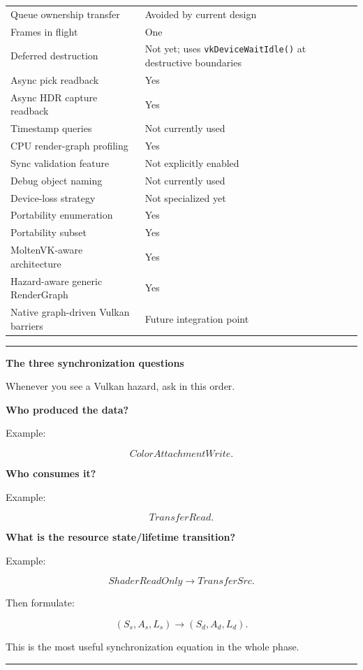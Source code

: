 {\begin{longtable}[]{@{}
  >{\raggedright\arraybackslash}p{}
  >{\raggedright\arraybackslash}p{}@{}}
Queue ownership transfer & Avoided by current design \\
Frames in flight & One \\
Deferred destruction & Not yet; uses \texttt{vkDeviceWaitIdle()} at destructive boundaries \\
Async pick readback & Yes \\
Async HDR capture readback & Yes \\
Timestamp queries & Not currently used \\
CPU render-graph profiling & Yes \\
Sync validation feature & Not explicitly enabled \\
Debug object naming & Not currently used \\
Device-loss strategy & Not specialized yet \\
Portability enumeration & Yes \\
Portability subset & Yes \\
MoltenVK-aware architecture & Yes \\
Hazard-aware generic RenderGraph & Yes \\
Native graph-driven Vulkan barriers & Future integration point \\
\end{longtable}
}

\begin{center}\rule{0.5\linewidth}{0.5pt}\end{center}

\textbf{The three synchronization questions}

Whenever you see a Vulkan hazard, ask in this order.

\textbf{Who produced the data?}

Example:

\[
ColorAttachmentWrite.
\]

\textbf{Who consumes it?}

Example:

\[
TransferRead.
\]

\textbf{What is the resource state/lifetime transition?}

Example:

\[
ShaderReadOnly
\rightarrow
TransferSrc.
\]

Then formulate:

\[
(S_s,A_s,L_s)
\rightarrow
(S_d,A_d,L_d).
\]

This is the most useful synchronization equation in the whole phase.

\begin{center}\rule{0.5\linewidth}{0.5pt}\end{center}

